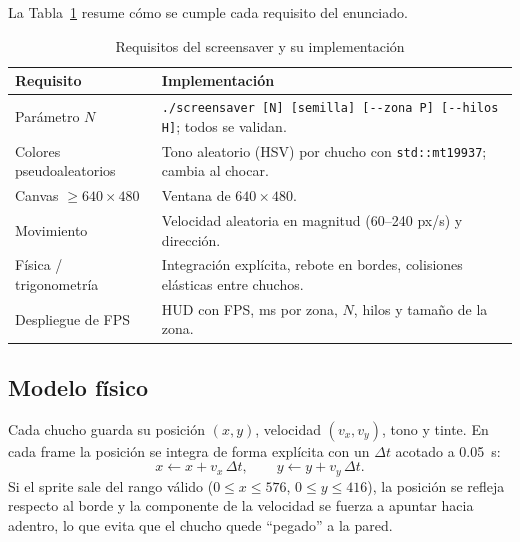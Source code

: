 \documentclass[11pt,letterpaper]{article}
\newcommand{\codigo}[1]{\texttt{#1}}
\begin{document}
La Tabla~\ref{tab:requisitos} resume cómo se cumple cada requisito del
enunciado.

\begin{table}[H]
  \centering
  \caption{Requisitos del screensaver y su implementación}
  \label{tab:requisitos}
  \begin{tabular}{>{\raggedright}p{4.2cm}p{10.5cm}}
    \toprule
    Requisito & Implementación \\
    \midrule
    Parámetro $N$ & \codigo{./screensaver [N] [semilla] [-{}-zona P] [-{}-hilos H]}; todos se validan. \\
    Colores pseudoaleatorios & Tono aleatorio (HSV) por chucho con \codigo{std::mt19937}; cambia al chocar. \\
    Canvas $\geq 640\times480$ & Ventana de $640\times480$. \\
    Movimiento & Velocidad aleatoria en magnitud (60--240 px/s) y dirección. \\
    Física / trigonometría & Integración explícita, rebote en bordes, colisiones elásticas entre chuchos. \\
    Despliegue de FPS & HUD con FPS, ms por zona, $N$, hilos y tamaño de la zona. \\
    \bottomrule
  \end{tabular}
\end{table}

\subsection{Modelo físico}

Cada chucho guarda su posición $(x,y)$, velocidad $(v_x,v_y)$, tono y tinte.
En cada frame la posición se integra de forma explícita con un $\Delta t$
acotado a 0.05~s:
\begin{equation}
  x \leftarrow x + v_x\,\Delta t, \qquad y \leftarrow y + v_y\,\Delta t.
\end{equation}
Si el sprite sale del rango válido ($0 \le x \le 576$, $0 \le y \le 416$), la
posición se refleja respecto al borde y la componente de la velocidad se fuerza
a apuntar hacia adentro, lo que evita que el chucho quede ``pegado'' a la pared.
\end{document}
